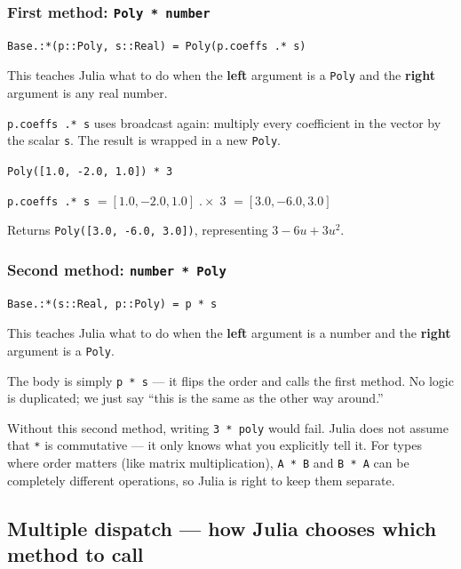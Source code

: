 \documentclass[12pt, a4paper]{article}
\newcommand{\cd}[1]{\texttt{#1}}
\begin{document}
\subsubsection{First method: \texttt{Poly * number}}

\begin{verbatim}
Base.:*(p::Poly, s::Real) = Poly(p.coeffs .* s)
\end{verbatim}

This teaches Julia what to do when the \textbf{left} argument is
a \cd{Poly} and the \textbf{right} argument is any real number.

\cd{p.coeffs .* s} uses broadcast again: multiply every coefficient
in the vector by the scalar \cd{s}.
The result is wrapped in a new \cd{Poly}.

\begin{examplebox}
\cd{Poly([1.0, -2.0, 1.0]) * 3}

\medskip
\cd{p.coeffs .* s}
$= [1.0, -2.0, 1.0] \;.\!\times\; 3$
$= [3.0, -6.0, 3.0]$

Returns \cd{Poly([3.0, -6.0, 3.0])},
representing $3 - 6u + 3u^2$.
\end{examplebox}

\subsubsection{Second method: \texttt{number * Poly}}

\begin{verbatim}
Base.:*(s::Real, p::Poly) = p * s
\end{verbatim}

This teaches Julia what to do when the \textbf{left} argument is
a number and the \textbf{right} argument is a \cd{Poly}.

The body is simply \cd{p * s} --- it flips the order and calls
the first method.
No logic is duplicated; we just say ``this is the same as the
other way around.''

\begin{notebox}
Without this second method, writing \cd{3 * poly} would fail.
Julia does not assume that \cd{*} is commutative ---
it only knows what you explicitly tell it.
For types where order matters (like matrix multiplication),
\cd{A * B} and \cd{B * A} can be completely different operations,
so Julia is right to keep them separate.
\end{notebox}

\subsection{Multiple dispatch --- how Julia chooses which method to call}
\end{document}
